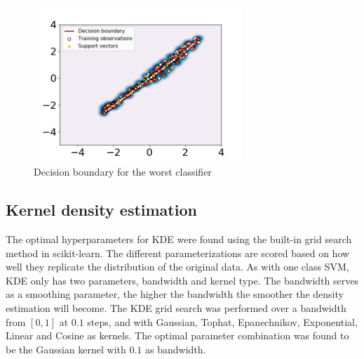                 \begin{figure}
                        \centering
                        \includegraphics[width=0.7\textwidth]{report/figures/analysis/gridsearch/Novelty detection, -1 training, gamma = 16 nu = 4.233252195999577e-06.png}
                        \caption{Decision boundary for the worst classifier}
                        \label{fig:svm_grid_wors}
                \end{figure}
    
                
                
            \subsection{Kernel density estimation}
                The optimal hyperparameters for KDE were found using the built-in grid search method in scikit-learn. The different parameterizations are scored based on how well they replicate the distribution of the original data. As with one class SVM, KDE only has two parameters, bandwidth and kernel type. The bandwidth serves as a smoothing parameter, the higher the bandwidth the smoother the density estimation will become. The KDE grid search was performed over a bandwidth from $[0,1]$ at $0.1$ steps, and with Gaussian, Tophat, Epanechnikov, Exponential, Linear and Cosine as kernels. The optimal parameter combination was found to be the Gaussian kernel with $0.1$ as bandwidth. 
                
                
